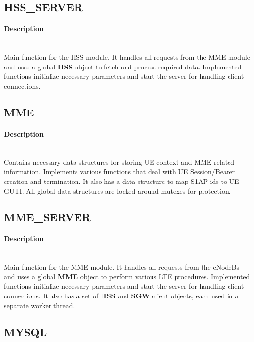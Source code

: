 \documentclass[hidelinks]{report}
\begin{document}
\subsection*{HSS\_SERVER}

\paragraph*{Description}

~\\ Main function for the HSS module. It handles all requests from the MME module and uses a global \textbf{HSS} object to fetch and process required data. Implemented functions initialize necessary parameters and start the server for handling client connections. 

\subsection*{MME}

\paragraph*{Description}

~\\ Contains necessary data structures for storing UE context and MME related information. Implements various functions that deal with UE Session/Bearer creation and termination. It also has a data structure to map S1AP ids to UE GUTI. All global data structures are locked around mutexes for protection.

\subsection*{MME\_SERVER}

\paragraph*{Description}

~\\ Main function for the MME module. It handles all requests from the eNodeBs and uses a global \textbf{MME} object to perform various LTE procedures. Implemented functions initialize necessary parameters and start the server for handling client connections. It also has a set of \textbf{HSS} and \textbf{SGW} client objects, each used in a separate worker thread.

\subsection*{MYSQL}
\end{document}
